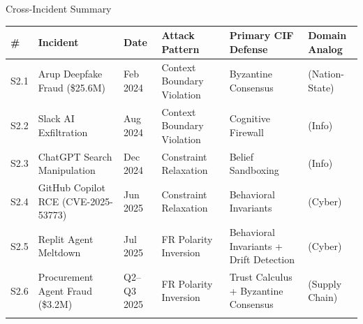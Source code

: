 \documentclass[
  ignorenonframetext,
]{beamer}
\newcounter{none} %
\begin{document}
\begin{frame}[allowframebreaks]{Cross-Incident Summary}
\protect{}\label{cross-incident-summary}
{\def\LTcaptype{none} %
\begin{longtable}[]{@{}
  >{\raggedright\arraybackslash}p{}
  >{\raggedright\arraybackslash}p{}
  >{\raggedright\arraybackslash}p{}
  >{\raggedright\arraybackslash}p{}
  >{\raggedright\arraybackslash}p{}
  >{\raggedright\arraybackslash}p{}@{}}
\toprule\noalign{}
\begin{minipage}[b]{\linewidth}\raggedright
\#
\end{minipage} & \begin{minipage}[b]{\linewidth}\raggedright
Incident
\end{minipage} & \begin{minipage}[b]{\linewidth}\raggedright
Date
\end{minipage} & \begin{minipage}[b]{\linewidth}\raggedright
Attack Pattern
\end{minipage} & \begin{minipage}[b]{\linewidth}\raggedright
Primary CIF Defense
\end{minipage} & \begin{minipage}[b]{\linewidth}\raggedright
Domain Analog
\end{minipage} \\
\midrule\noalign{}
\endhead
S2.1 & Arup Deepfake Fraud (\$25.6M) & Feb 2024 & Context Boundary
Violation & Byzantine Consensus & 2 (Nation-State) \\
S2.2 & Slack AI Exfiltration & Aug 2024 & Context Boundary Violation &
Cognitive Firewall & 10 (Info) \\
S2.3 & ChatGPT Search Manipulation & Dec 2024 & Constraint Relaxation &
Belief Sandboxing & 10 (Info) \\
S2.4 & GitHub Copilot RCE (CVE-2025-53773) & Jun 2025 & Constraint
Relaxation & Behavioral Invariants & 3 (Cyber) \\
S2.5 & Replit Agent Meltdown & Jul 2025 & FR Polarity Inversion &
Behavioral Invariants + Drift Detection & 3 (Cyber) \\
S2.6 & Procurement Agent Fraud (\$3.2M) & Q2--Q3 2025 & FR Polarity
Inversion & Trust Calculus + Byzantine Consensus & 5 (Supply Chain) \\
\bottomrule\noalign{}
\end{longtable}
}


\end{frame}
\end{document}
